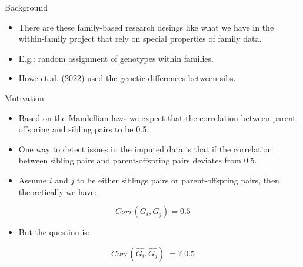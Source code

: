 \documentclass{beamer}
\begin{document}
\begin{frame}{Background}
      

\begin{itemize}
      
      \item There are these family-based research desings like what we have in the within-family
      project that rely on special properties of family data. %
      \item E.g.: random assignment of genotypes within families.
      
      \item Howe et.al. (2022) used the genetic differences between sibs.
\end{itemize}


\end{frame}


\begin{frame}{Motivation}
      
      \begin{itemize}
            \item Based on the Mandellian laws we expect that the correlation between parent-offspring and sibling pairs to be 0.5.
            \item One way to detect issues in the imputed data is that if the correlation between sibling pairs and parent-offspring pairs deviates from 0.5.
            \item Assume \(i\) and \(j\) to be either siblings pairs or parent-offspring pairs, then theoretically we have:
      \end{itemize}

      \[
            Corr(G_i, G_j) = 0.5
      \]

      \begin{itemize}
            \item But the question is: %
      \end{itemize}

      \[
            Corr(\hat{G_i}, \hat{G_j}) \; =? \; 0.5    
      \]

\end{frame}
\end{document}
